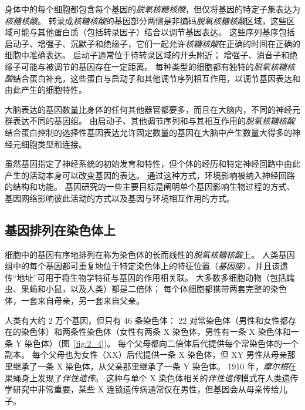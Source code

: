 身体中的每个细胞都包含每个基因的\textit{脱氧核糖核酸}，但仅将基因的特定子集表达为\textit{核糖核酸}。
转录成\textit{核糖核酸}的基因部分两侧是非编码\textit{脱氧核糖核酸}区域，这些区域可能与其他蛋白质（包括转录因子）结合以调节基因表达。
这些序列基序包括启动子、增强子、沉默子和绝缘子，它们一起允许\textit{核糖核酸}在正确的时间在正确的细胞中准确表达。
启动子通常位于待转录区域的开头附近；
增强子、消音子和绝缘子可能与被调节的基因存在一定距离。
每种类型的细胞都有独特的\textit{脱氧核糖核酸}结合蛋白补充，这些蛋白与启动子和其他调节序列相互作用，以调节基因表达和由此产生的细胞特性。


大脑表达的基因数量比身体的任何其他器官都要多，而且在大脑内，不同的神经元群表达不同的基因组。
由启动子、其他调节序列和与其相互作用的\textit{脱氧核糖核酸}结合蛋白控制的选择性基因表达允许固定数量的基因在大脑中产生数量大得多的神经元细胞类型和连接。


虽然基因指定了神经系统的初始发育和特性，但个体的经历和特定神经回路中由此产生的活动本身可以改变基因的表达。
通过这种方式，环境影响被纳入神经回路的结构和功能。
基因研究的一些主要目标是阐明单个基因影响生物过程的方式、基因网络影响彼此活动的方式以及基因与环境相互作用的方式。



\subsection{基因排列在染色体上}

细胞中的基因有序地排列在称为染色体的长而线性的\textit{脱氧核糖核酸}上。
人类基因组中的每个基因都可重复地位于特定染色体上的特征位置（\textit{基因座}），并且该遗传“地址”可用于将生物学特征与基因的作用相关联。
大多数多细胞动物（包括蠕虫、果蝇和小鼠，以及人类）都是二倍体；
每个体细胞都携带两套完整的染色体，一套来自母亲，另一套来自父亲。


人类有大约 2 万个基因，但只有 46 条染色体：
22 对常染色体（男性和女性都存在的染色体）和两条性染色体（女性有两条 X 染色体，男性有一条 X 染色体和一条 Y 染色体）（图~\ref{fig:2_4})。
每个父母都向二倍体后代提供每个常染色体的一个副本。
每个父母也为女性（XX）后代提供一条 X 染色体，但 XY 男性从母亲那里继承了一条 X 染色体，从父亲那里继承了一条 Y 染色体。
1910 年，\textit{摩尔根}在果蝇身上发现了\textit{伴性遗传}。
这种与单个 X 染色体相关的\textit{伴性遗传}模式在人类遗传学研究中非常重要，某些 X 连锁遗传病通常仅在男性，但基因会从母亲传给儿子。


